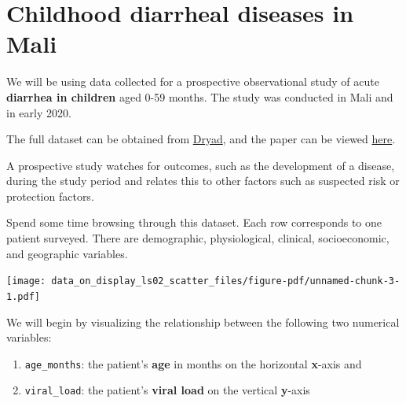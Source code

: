 \documentclass[
  letterpaper,
  DIV=11,
  numbers=noendperiod]{scrreprt}
\providecommand{\tightlist}{%
  \setlength{\itemsep}{0pt}\setlength{\parskip}{0pt}}\usepackage{longtable,booktabs,array}
\begin{document}
\hypertarget{childhood-diarrheal-diseases-in-mali}{%
\section{Childhood diarrheal diseases in
Mali}\label{childhood-diarrheal-diseases-in-mali}}

We will be using data collected for a prospective observational study of
acute \textbf{diarrhea in children} aged 0-59 months. The study was
conducted in Mali and in early 2020.

The full dataset can be obtained from
\href{https://doi.org/10.5061/dryad.0rxwdbs19}{Dryad}, and the paper can
be viewed \href{https://elifesciences.org/articles/72294}{here}.

\begin{tcolorbox}[enhanced jigsaw, colframe=quarto-callout-note-color-frame, colbacktitle=quarto-callout-note-color!10!white, titlerule=0mm, opacitybacktitle=0.6, breakable, toprule=.15mm, arc=.35mm, rightrule=.15mm, colback=white, bottomrule=.15mm, opacityback=0, toptitle=1mm, left=2mm, bottomtitle=1mm, title=\textcolor{quarto-callout-note-color}{\faInfo}\hspace{0.5em}{Vocab}, leftrule=.75mm, coltitle=black]

A prospective study watches for outcomes, such as the development of a
disease, during the study period and relates this to other factors such
as suspected risk or protection factors.

\end{tcolorbox}

Spend some time browsing through this dataset. Each row corresponds to
one patient surveyed. There are demographic, physiological, clinical,
socioeconomic, and geographic variables.

\texttt{[image: data\_on\_display\_ls02\_scatter\_files/figure-pdf/unnamed-chunk-3-1.pdf]}

We will begin by visualizing the relationship between the following two
numerical variables:

\begin{enumerate}
\def\labelenumi{\arabic{enumi}.}
\tightlist
\item
  \texttt{age\_months}: the patient's \textbf{age} in months on the
  horizontal \textbf{x}-axis and
\item
  \texttt{viral\_load}: the patient's \textbf{viral load} on the
  vertical \textbf{y}-axis
\end{enumerate}
\end{document}
